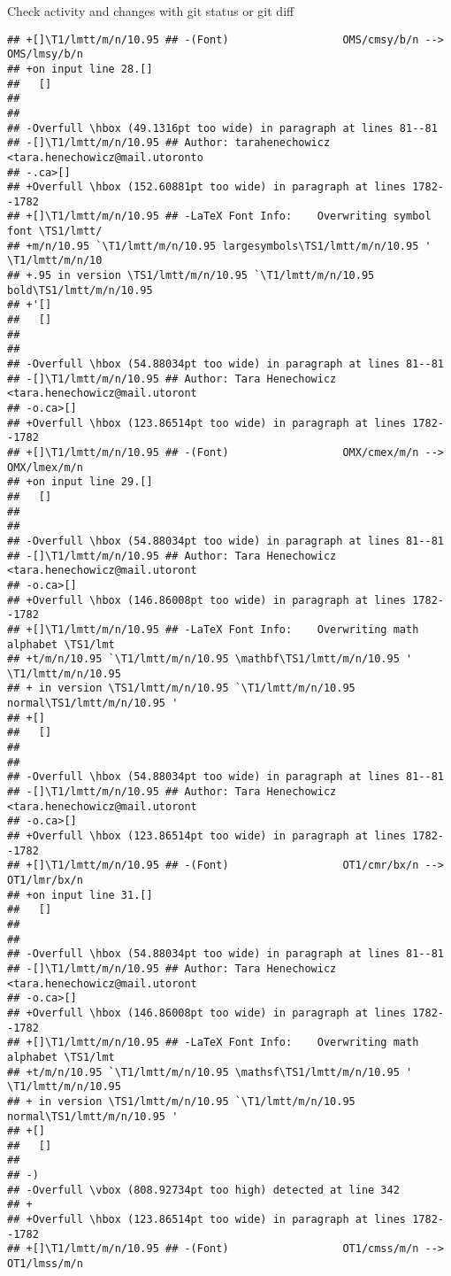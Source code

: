 \documentclass[ignorenonframetext,]{beamer}
\begin{document}
\begin{frame}[fragile]{Check activity and changes with git status or git
diff}
\begin{verbatim}
## +[]\T1/lmtt/m/n/10.95 ## -(Font)                  OMS/cmsy/b/n --> OMS/lmsy/b/n 
## +on input line 28.[] 
##   []
##  
##  
## -Overfull \hbox (49.1316pt too wide) in paragraph at lines 81--81
## -[]\T1/lmtt/m/n/10.95 ## Author: tarahenechowicz <tara.henechowicz@mail.utoronto
## -.ca>[] 
## +Overfull \hbox (152.60881pt too wide) in paragraph at lines 1782--1782
## +[]\T1/lmtt/m/n/10.95 ## -LaTeX Font Info:    Overwriting symbol font \TS1/lmtt/
## +m/n/10.95 `\T1/lmtt/m/n/10.95 largesymbols\TS1/lmtt/m/n/10.95 ' \T1/lmtt/m/n/10
## +.95 in version \TS1/lmtt/m/n/10.95 `\T1/lmtt/m/n/10.95 bold\TS1/lmtt/m/n/10.95 
## +'[] 
##   []
##  
##  
## -Overfull \hbox (54.88034pt too wide) in paragraph at lines 81--81
## -[]\T1/lmtt/m/n/10.95 ## Author: Tara Henechowicz <tara.henechowicz@mail.utoront
## -o.ca>[] 
## +Overfull \hbox (123.86514pt too wide) in paragraph at lines 1782--1782
## +[]\T1/lmtt/m/n/10.95 ## -(Font)                  OMX/cmex/m/n --> OMX/lmex/m/n 
## +on input line 29.[] 
##   []
##  
##  
## -Overfull \hbox (54.88034pt too wide) in paragraph at lines 81--81
## -[]\T1/lmtt/m/n/10.95 ## Author: Tara Henechowicz <tara.henechowicz@mail.utoront
## -o.ca>[] 
## +Overfull \hbox (146.86008pt too wide) in paragraph at lines 1782--1782
## +[]\T1/lmtt/m/n/10.95 ## -LaTeX Font Info:    Overwriting math alphabet \TS1/lmt
## +t/m/n/10.95 `\T1/lmtt/m/n/10.95 \mathbf\TS1/lmtt/m/n/10.95 ' \T1/lmtt/m/n/10.95
## + in version \TS1/lmtt/m/n/10.95 `\T1/lmtt/m/n/10.95 normal\TS1/lmtt/m/n/10.95 '
## +[] 
##   []
##  
##  
## -Overfull \hbox (54.88034pt too wide) in paragraph at lines 81--81
## -[]\T1/lmtt/m/n/10.95 ## Author: Tara Henechowicz <tara.henechowicz@mail.utoront
## -o.ca>[] 
## +Overfull \hbox (123.86514pt too wide) in paragraph at lines 1782--1782
## +[]\T1/lmtt/m/n/10.95 ## -(Font)                  OT1/cmr/bx/n --> OT1/lmr/bx/n 
## +on input line 31.[] 
##   []
##  
##  
## -Overfull \hbox (54.88034pt too wide) in paragraph at lines 81--81
## -[]\T1/lmtt/m/n/10.95 ## Author: Tara Henechowicz <tara.henechowicz@mail.utoront
## -o.ca>[] 
## +Overfull \hbox (146.86008pt too wide) in paragraph at lines 1782--1782
## +[]\T1/lmtt/m/n/10.95 ## -LaTeX Font Info:    Overwriting math alphabet \TS1/lmt
## +t/m/n/10.95 `\T1/lmtt/m/n/10.95 \mathsf\TS1/lmtt/m/n/10.95 ' \T1/lmtt/m/n/10.95
## + in version \TS1/lmtt/m/n/10.95 `\T1/lmtt/m/n/10.95 normal\TS1/lmtt/m/n/10.95 '
## +[] 
##   []
##  
## -)
## -Overfull \vbox (808.92734pt too high) detected at line 342
## +
## +Overfull \hbox (123.86514pt too wide) in paragraph at lines 1782--1782
## +[]\T1/lmtt/m/n/10.95 ## -(Font)                  OT1/cmss/m/n --> OT1/lmss/m/n 

\end{verbatim}
\end{frame}
\end{document}
